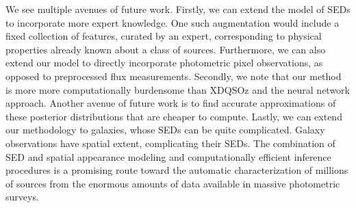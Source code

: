 \documentclass{article} %
\begin{document}
We see multiple avenues of future work.
Firstly, we can extend the model of SEDs to incorporate more expert knowledge.
One such augmentation would include a fixed collection of features, curated by an expert, corresponding to physical properties already known about a class of sources.  
Furthermore, we can also extend our model to directly incorporate photometric pixel observations, as opposed to preprocessed flux measurements.
Secondly, we note that our method is more more computationally burdensome than XDQSOz and the neural network approach.  Another avenue of future work is to find accurate approximations of these posterior distributions that are cheaper to compute. 
Lastly, we can extend our methodology to galaxies, whose SEDs can be quite complicated.  Galaxy observations have spatial extent, complicating their SEDs. 
The combination of SED and spatial appearance modeling and computationally efficient inference procedures is a promising route toward the automatic characterization of millions of sources from the enormous amounts of data available in massive photometric surveys.  

\end{document}
